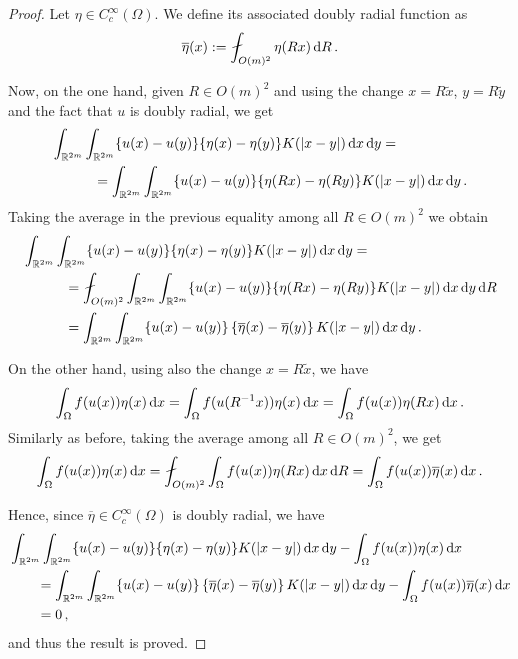 \begin{proof}
	Let $\eta \in C^\infty_c(\Omega)$. We define its associated doubly radial function as
	$$
	\overline{\eta}(x) := \average_{O(m)^2}\eta(R x)\d R\,.
	$$
	
	Now, on the one hand, given $R\in O(m)^2$ and using the change $x = R\tilde{x}$, $y = R \tilde{y}$ and the fact that $u$ is doubly radial, we get
	\begin{align*}
	&\int_{\mathbb{R}^{2m}}\int_{\mathbb{R}^{2m}} \{u(x)-u(y)\}\{\eta(x)-\eta(y)\} K(|x-y|) \,\mathrm{d} x \,\mathrm{d} y = \\
	&\quad \quad \quad = \int_{\mathbb{R}^{2m}}\int_{\mathbb{R}^{2m}} \{u(x)-u(y)\}\{\eta(R x)-\eta(R y)\} K(|x-y|) \,\mathrm{d} x \,\mathrm{d} y\,.
	\end{align*}
	Taking the average in the previous equality among all $R\in O(m)^2$ we obtain
	\begin{align*}
	& \int_{\R^{2m}}\int_{\R^{2m}} \{u(x)-u(y)\}\{\eta(x)-\eta(y)\} K(|x-y|) \d x \d y = \\
	&\quad \quad \quad =\average_{O(m)^2} \int_{\R^{2m}}\int_{\R^{2m}} \{u(x)-u(y)\}\{\eta(R x)-\eta(R y)\} K(|x-y|) \d x \d y \d R \\
	&\quad \quad \quad= \int_{\R^{2m}}\int_{\R^{2m}} \{u(x)-u(y)\}\left \{\overline{\eta}(x) -\overline{\eta}(y)  \right \} K(|x-y|) \d x \d y \,.
	\end{align*}
	
	On the other hand, using also the change $x = R\tilde{x}$, we have
	$$
	\int_{\Omega} f(u(x)) \eta(x) \,\mathrm{d} x = \int_{\Omega} f(u(R^{-1}x)) \eta(x) \,\mathrm{d} x = \int_{\Omega} f(u(x)) \eta(Rx) \,\mathrm{d} x\,.
	$$
	Similarly as before, taking the average among all $R\in O(m)^2$, we get
	$$
	\int_{\Omega} f(u(x)) \eta(x) \d x = \average_{O(m)^2} \int_{\Omega} f(u(x)) \eta(Rx) \d x \d R = \int_{\Omega} f(u(x))\overline{\eta}(x) \d x\,.
	$$
	
	Hence, since $\overline{\eta} \in C^\infty_c(\Omega)$ is doubly radial, we have
	\begin{align*}
		&\int_{\mathbb{R}^{2m}}\int_{\mathbb{R}^{2m}} \{u(x)-u(y)\}\{\eta(x)-\eta(y)\} K(|x-y|) \,\mathrm{d} x \,\mathrm{d} y - \int_{\Omega} f(u(x)) \eta(x) \,\mathrm{d} x \\
		&\quad \quad= \int_{\mathbb{R}^{2m}}\int_{\mathbb{R}^{2m}} \{u(x)-u(y)\}\left \{\overline{\eta}(x) -\overline{\eta}(y)  \right \} K(|x-y|) \,\mathrm{d} x \,\mathrm{d} y - \int_{\Omega} f(u(x))\overline{\eta}(x) \,\mathrm{d} x \\
		&\quad \quad= 0\,,
	\end{align*}
	and thus the result is proved.
\end{proof}



